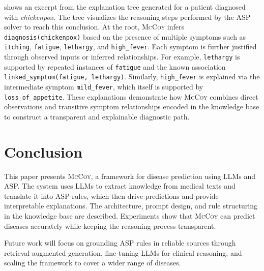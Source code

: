 \documentclass[11pt,leqno]{amsart}
\newcommand{\sys}{\textsc{McCoy}\xspace}
\begin{document}
 shows an excerpt from the explanation 
tree generated for a patient diagnosed with \textit{chickenpox}. 
The tree visualizes the reasoning steps performed by the ASP solver to reach this conclusion. 
At the root, \sys infers \texttt{diagnosis(chickenpox)} 
based on the presence of multiple symptoms such as \texttt{itching}, \texttt{fatigue}, \texttt{lethargy}, 
and \texttt{high\_fever}. 
Each symptom is further justified through observed inputs or inferred relationships. 
For example, \texttt{lethargy} is supported by repeated instances of \texttt{fatigue} 
and the known association \texttt{linked\_symptom(fatigue, lethargy)}. 
Similarly, \texttt{high\_fever} is explained via the intermediate symptom \texttt{mild\_fever}, 
which itself is supported by \texttt{loss\_of\_appetite}. 
These explanations demonstrate how \sys combines direct observations 
and transitive symptom relationships encoded in the knowledge base to 
construct a transparent and explainable diagnostic path.

\section{Conclusion}\label{sec:conclusion}

This paper presents \sys, a framework for disease prediction using LLMs and ASP. 
The system uses LLMs to extract knowledge from medical texts and translate it into ASP rules, 
which then drive predictions and provide interpretable explanations. 
The architecture, prompt design, and rule structuring in the knowledge base are described.
Experiments show that \sys can predict diseases accurately 
while keeping the reasoning process transparent.

Future work will focus on grounding ASP rules in reliable sources 
through retrieval-augmented generation, fine-tuning LLMs for clinical reasoning, 
and scaling the framework to cover a wider range of diseases.
\newpage


\end{document}

